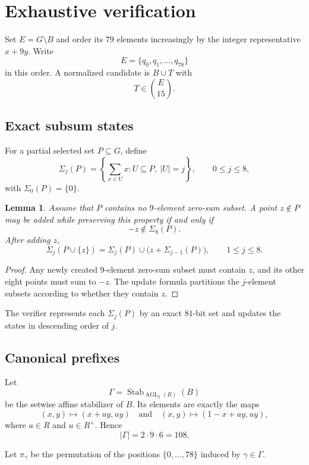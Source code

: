 \documentclass[11pt]{amsart}
\newtheorem{lemma}[theorem]{Lemma}
\newcommand{\AGL}{\operatorname{AGL}}
\begin{document}
\section{Exhaustive verification}\label{sec:search}

Set $E=G\setminus B$ and order its $79$ elements increasingly by the
integer representative $x+9y$. Write
\[
  E=\{q_0,q_1,\ldots,q_{78}\}
\]
in this order. A normalized candidate is $B\cup T$ with
\[
  T\in\binom{E}{15}.
\]

\subsection{Exact subsum states}

For a partial selected set $P\subseteq G$, define
\[
  \Sigma_j(P)=
  \left\{
    \sum_{x\in U}x:
    U\subseteq P,\ |U|=j
  \right\},
  \qquad
  0\leq j\leq8,
\]
with $\Sigma_0(P)=\{0\}$.

\begin{lemma}\label{lem:update}
Assume that $P$ contains no $9$-element zero-sum subset. A point
$z\notin P$ may be added while preserving this property if and only if
\[
  -z\notin\Sigma_8(P).
\]
After adding $z$,
\[
  \Sigma_j(P\cup\{z\})
  =
  \Sigma_j(P)\cup
  \bigl(z+\Sigma_{j-1}(P)\bigr),
  \qquad
  1\leq j\leq8.
\]
\end{lemma}

\begin{proof}
Any newly created $9$-element zero-sum subset must contain $z$, and its
other eight points must sum to $-z$. The update formula partitions the
$j$-element subsets according to whether they contain $z$.
\end{proof}

The verifier represents each $\Sigma_j(P)$ by an exact $81$-bit set and
updates the states in descending order of $j$.

\subsection{Canonical prefixes}

Let
\[
  \Gamma=\operatorname{Stab}_{\AGL_2(R)}(B)
\]
be the setwise affine stabilizer of $B$. Its elements are exactly the maps
\[
  (x,y)\longmapsto(x+ay,uy)
  \quad\text{and}\quad
  (x,y)\longmapsto(1-x+ay,uy),
\]
where $a\in R$ and $u\in R^\times$. Hence
\[
  |\Gamma|=2\cdot9\cdot6=108.
\]

Let $\pi_\gamma$ be the permutation of the positions
$\{0,\ldots,78\}$ induced by $\gamma\in\Gamma$.
\end{document}
